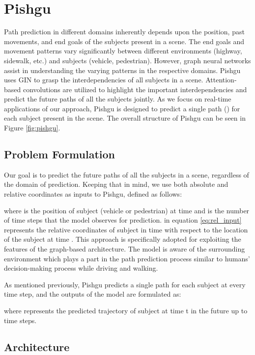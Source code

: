 \documentclass[sigconf]{acmart}
\begin{document}
 \section{Pishgu} \label{sec:pishgu}
Path prediction in different domains inherently depends upon the position, past movements, and end goals of the subjects present in a scene. The end goals and movement patterns vary significantly between different environments (highway, sidewalk, etc.) and subjects (vehicle, pedestrian). However, graph neural networks assist in understanding the varying patterns in the respective domains. Pishgu uses GIN to grasp the interdependencies of all subjects in a scene. Attention-based convolutions are utilized to highlight the important interdependencies and predict the future paths of all the subjects jointly. As we focus on real-time applications of our approach, Pishgu is designed to predict a single path () for each subject present in the scene. The overall structure of Pishgu can be seen in Figure \ref{fig:pishgu}.


\subsection{Problem Formulation}
Our goal is to predict the future paths of all the subjects in a scene, regardless of the domain of prediction. Keeping that in mind, we use both absolute and relative coordinates as inputs to Pishgu, defined as follows:

    
        
    
where  is the position of subject  (vehicle or pedestrian)  at time  and  is the number of time steps that the model observes for prediction.  in equation \ref{eq:rel_input} represents the relative coordinates of subject  in time  with respect to the location of the subject at time . This approach is specifically adopted for exploiting the features of the graph-based architecture. The model is aware of the surrounding environment which plays a part in the path prediction process similar to humans' decision-making process while driving and walking. 

As mentioned previously, Pishgu predicts a single path for each subject at every time step, and the outputs of the model are formulated as:

where  represents the predicted trajectory of subject  at time t in the future up to  time steps.

\subsection{Architecture}
\end{document}
